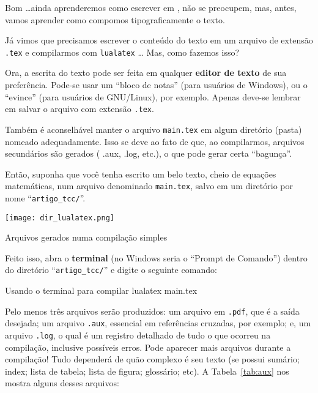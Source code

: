 Bom \ldots ainda aprenderemos como escrever em , não se preocupem,
mas, antes, vamos aprender como compomos tipograficamente o texto.

Já vimos que precisamos escrever o conteúdo do texto em um arquivo de extensão
\texttt{.tex} e compilarmos com \texttt{lualatex} \ldots 
Mas, como fazemos isso?

Ora, a escrita do texto pode ser feita em qualquer \textbf{editor de texto} de 
sua preferência.
Pode-se usar um ``bloco de notas'' (para usuários de Windows), ou o ``evince'' (para
usuários de GNU/Linux), por exemplo.
Apenas deve-se lembrar em salvar o arquivo com extensão \texttt{.tex}.

Também é aconselhável manter o arquivo \texttt{main.tex} em algum diretório (pasta) 
nomeado adequadamente.
Isso se deve ao fato de que, ao compilarmos, arquivos secundários são gerados (
.aux, .log, etc.), o que pode gerar certa ``bagunça''.

Então, suponha que você tenha escrito um belo texto, cheio de equações matemáticas,
num arquivo denominado \texttt{main.tex}, salvo em um diretório por nome 
``\texttt{artigo\_tcc/}''.
\begin{marginfigure}
  \centering
  \texttt{[image: dir\_lualatex.png]}
  \caption{Arquivos gerados numa compilação simples}
\end{marginfigure}
Feito isso, abra o \textbf{terminal} (no Windows seria o ``Prompt de Comando'') 
dentro do diretório ``\texttt{artigo\_tcc/}'' e digite o seguinte comando:

\begin{codigo}{Usando o terminal para compilar}{\lapis}
  lualatex main.tex
\end{codigo}

Pelo menos três arquivos serão produzidos: um arquivo em \texttt{.pdf}, que é a 
saída desejada; um arquivo \texttt{.aux}, essencial em referências cruzadas, por 
exemplo; e, um arquivo \texttt{.log}, o qual é um registro detalhado de tudo o que
ocorreu na compilação, inclusive possíveis erros.
Pode aparecer mais arquivos durante a compilação!
Tudo dependerá de quão complexo é seu texto (se possui sumário; index; lista de tabela;
lista de figura; glossário; etc).
A Tabela~\ref{tab:aux} nos mostra alguns desses arquivos:

